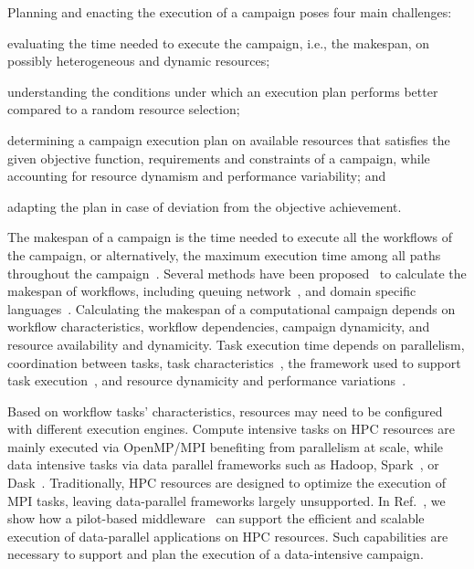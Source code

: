 Planning and enacting the execution of a campaign poses four main challenges: 
\begin{inparaenum}[(i)]
\item evaluating the time needed to execute the campaign, i.e., the makespan, on possibly heterogeneous and dynamic resources;
\item  understanding the conditions under which an execution plan performs better compared to a random resource selection;
\item determining a campaign execution plan on available resources that satisfies the given objective function, requirements and constraints of a campaign, while accounting for resource dynamism and performance variability; and
\item adapting the plan in case of deviation from the objective achievement.
\end{inparaenum}

The makespan of a campaign is the time needed to execute all the workflows of the campaign, or alternatively, the maximum execution time among all paths throughout the campaign~\cite{chirkin2017execution}.
Several methods have been proposed~\cite{lu2019review} to calculate the makespan of workflows, including queuing network~\cite{yao2019throughput,bao2019performance}, and domain specific languages~\cite{carothers2017durango,maheshwari2016workflow}.
Calculating the makespan of a computational campaign depends on workflow characteristics, workflow dependencies, campaign dynamicity, and resource availability and dynamicity.
Task execution time depends on parallelism, coordination between tasks, task characteristics~\cite{khoshlessan2017parallel}, the framework used to support task execution~\cite{paraskevakos2018task}, and resource dynamicity and performance variations~\cite{paraskevakos2019workflow, pouchard2019computational}.

Based on workflow tasks’ characteristics, resources may need to be configured with different execution engines.
Compute intensive tasks on HPC resources are mainly executed via OpenMP/MPI benefiting from parallelism at scale, while data intensive tasks via data parallel frameworks such as Hadoop, Spark~\cite{zaharia2010spark}, or Dask~\cite{rocklin2015dask}.
Traditionally, HPC resources are designed to optimize the execution of MPI tasks, leaving data-parallel frameworks largely unsupported.
In Ref.~\cite{luckow2016hadoop}, we show how a pilot-based middleware~\cite{merzky2019using} can support the efficient and scalable execution of data-parallel applications on HPC resources.
Such capabilities are necessary to support and plan the execution of a data-intensive campaign.

